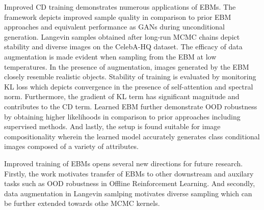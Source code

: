 \documentclass[11pt,letterpaper]{article}
\begin{document}
Improved CD training demonstrates numerous applications of EBMs. The framework depicts improved sample quality in comparison to prior EBM approaches and equivalent performance as GANs during unconditional generation. Langevin samples obtained after long-run MCMC chains depict stability and diverse images on the CelebA-HQ dataset. The efficacy of data augmentation is made evident when sampling from the EBM at low temperatures. In the presence of augmentation, images generated by the EBM closely resemble realistic objects. Stability of training is evaluated by monitoring KL loss which depicts convergence in the presence of self-attention and spectral norm. Furthermore, the gradient of KL term has significant magnitude and contributes to the CD term. Learned EBM further demonstrate OOD robustness by obtaining higher likelihoods in comparison to prior approaches including supervised methods. And lastly, the setup is found suitable for image compositionality wherein the learned model accurately generates class conditional images composed of a variety of attributes. 

Improved training of EBMs opens several new directions for future research. Firstly, the work motivates transfer of EBMs to other downstream and auxilary tasks such as OOD robustness in Offline Reinforcement Learning. And secondly, data augmentation in Langevin samlping motivates diverse sampling which can be further extended towards othe MCMC kernels.
\end{document}
